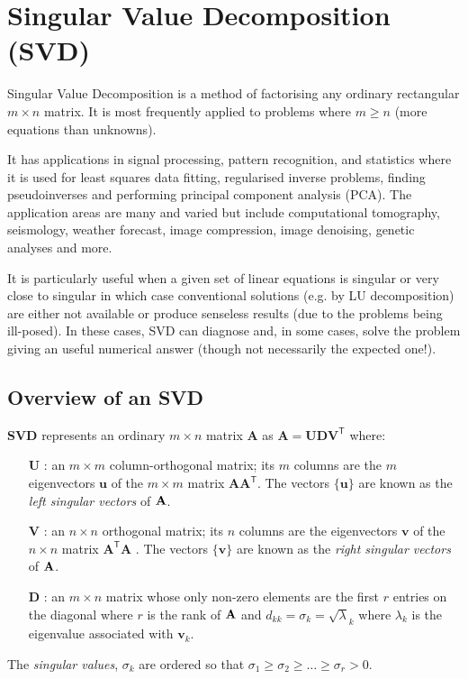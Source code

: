 
\section{Singular Value Decomposition (SVD)}

Singular Value Decomposition is a method of factorising any ordinary rectangular $m\times n$ matrix.  It is most frequently applied to problems where  $m\ge n$ (more equations than unknowns).

It has  applications in signal processing, pattern recognition, and statistics where it is used for 
 least squares data fitting, regularised inverse problems, finding pseudoinverses and performing principal component analysis (PCA).  The application areas are many and varied but include computational tomography, seismology, weather forecast, image compression, image denoising, genetic analyses and more.
 
It is particularly useful when a given set  of linear equations is singular or very close to 
singular in which case conventional solutions (e.g. by LU decomposition) are either not available or produce senseless results (due to the problems being ill-posed).  In these cases, SVD can diagnose and, in some cases, solve the problem giving an useful numerical answer (though not necessarily the  expected one!).

\subsection{Overview of an SVD}

{\bf SVD} represents an ordinary $m \times n$ matrix $\mathbf{A}$ as 
$\mathbf{A} = \mathbf{UDV}^\mathsf{T}$ where:
\begin{itemize}
\item[$\mathbf{U}$] : an $m \times m$ column-orthogonal matrix; its $m$ columns are the $m$ eigenvectors $\mathbf{u}$ of 
the $m\times m$ matrix $\mathbf{AA}^\mathsf{T}$. The vectors $\{ \mathbf u \}$ are known as the {\em left singular vectors} of $\bf A$.
\item[$\mathbf{V}$] : an $n \times n$ orthogonal matrix; its $n$ columns are the eigenvectors $\mathbf{v}$ of 
the $n\times n$ matrix $\mathbf{A}^\mathsf{T}\mathbf{A}$ . The vectors $\{ \mathbf v \}$ are known as the {\em right singular vectors} of $\bf A$.

\item[$\mathbf{D}$]  : an $m \times n$ matrix whose only non-zero elements are the first $r$ entries on the diagonal where $r$ is the rank of $\bf A$ and  $d_{kk} = \sigma_k = \sqrt \lambda_k$ where $\lambda_k$ is the eigenvalue associated with $\mathbf v_k$.
\end{itemize}
The {\em singular values}, $\sigma_k$ are ordered so that $\sigma_1\ge\sigma_2\ge\ldots\ge\sigma_r > 0$.

